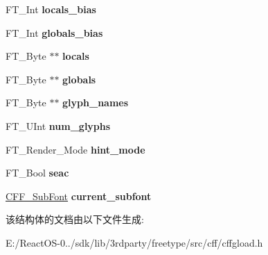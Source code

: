 \begin{DoxyCompactItemize}
F\+T\+\_\+\+Int {\bfseries locals\+\_\+bias}
\item 
\mbox{\label{struct_c_f_f___decoder___aa6070ea99029b41dfd2058bd80631889}} 
F\+T\+\_\+\+Int {\bfseries globals\+\_\+bias}
\item 
\mbox{\label{struct_c_f_f___decoder___a73ddc4c41f9d331b547ca3b747f18748}} 
F\+T\+\_\+\+Byte $\ast$$\ast$ {\bfseries locals}
\item 
\mbox{\label{struct_c_f_f___decoder___aadf635ae7bc701e672d45d15cf09668f}} 
F\+T\+\_\+\+Byte $\ast$$\ast$ {\bfseries globals}
\item 
\mbox{\label{struct_c_f_f___decoder___a0b0a776add983dbd3df97224eb56d18b}} 
F\+T\+\_\+\+Byte $\ast$$\ast$ {\bfseries glyph\+\_\+names}
\item 
\mbox{\label{struct_c_f_f___decoder___a8f41d4378dae59fe52c1451db80d25c6}} 
F\+T\+\_\+\+U\+Int {\bfseries num\+\_\+glyphs}
\item 
\mbox{\label{struct_c_f_f___decoder___a67906a908923c392f2cbe954da0dc545}} 
F\+T\+\_\+\+Render\+\_\+\+Mode {\bfseries hint\+\_\+mode}
\item 
\mbox{\label{struct_c_f_f___decoder___a51dad91cd321e76a470fe3fe6566b67f}} 
F\+T\+\_\+\+Bool {\bfseries seac}
\item 
\mbox{\label{struct_c_f_f___decoder___aba8d1c264e2001dd2ced04f81af8b7ac}} 
\hyperlink{struct_c_f_f___sub_font_rec__}{C\+F\+F\+\_\+\+Sub\+Font} {\bfseries current\+\_\+subfont}
\end{DoxyCompactItemize}


该结构体的文档由以下文件生成\+:\begin{DoxyCompactItemize}
\item 
E\+:/\+React\+O\+S-\/0../sdk/lib/3rdparty/freetype/src/cff/cffgload.\+h\end{DoxyCompactItemize}
